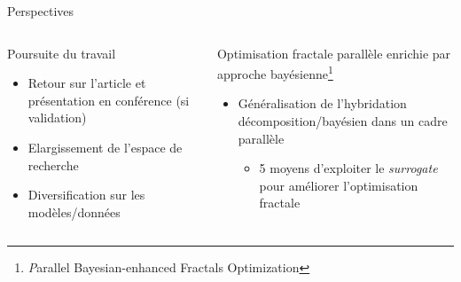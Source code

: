 
\begin{frame}{Perspectives}
    \begin{columns}
        
        \begin{column}[t]{0.45\textwidth} 
            \begin{block}{Poursuite du travail}
                \begin{itemize}
                    \item Retour sur l'article et présentation en conférence (si validation)
                    \item Elargissement de l'espace de recherche
                    \item Diversification sur les modèles/données
                \end{itemize}                
            \end{block}

        \end{column}  
            \begin{column}[t]{0.45\textwidth}
                \begin{block}{Optimisation fractale parallèle enrichie par approche bayésienne\footnote[3]{\textit Parallel Bayesian-enhanced Fractals Optimization}}

                    \begin{itemize}
                        \item Généralisation de l'hybridation décomposition/bayésien dans un cadre parallèle
                        \begin{itemize}
                            \item 5 moyens d'exploiter le \textit{surrogate} pour améliorer l'optimisation fractale
                        \end{itemize}
                    \end{itemize}
                \end{block}
            \end{column}
        
                 
    \end{columns}
    
\end{frame}